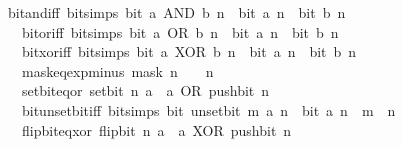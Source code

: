 \begin{isabellebody}
\ \ \ bit{\isacharunderscore}{\kern0pt}and{\isacharunderscore}{\kern0pt}iff\ {\isacharbrackleft}{\kern0pt}bit{\isacharunderscore}{\kern0pt}simps{\isacharbrackright}{\kern0pt}{\isacharcolon}{\kern0pt}\ {\isacartoucheopen}bit\ {\isacharparenleft}{\kern0pt}a\ AND\ b{\isacharparenright}{\kern0pt}\ n\ {\isasymlongleftrightarrow}\ bit\ a\ n\ {\isasymand}\ bit\ b\ n{\isacartoucheclose}\isanewline
\ \ \ \ \ bit{\isacharunderscore}{\kern0pt}or{\isacharunderscore}{\kern0pt}iff\ {\isacharbrackleft}{\kern0pt}bit{\isacharunderscore}{\kern0pt}simps{\isacharbrackright}{\kern0pt}{\isacharcolon}{\kern0pt}\ {\isacartoucheopen}bit\ {\isacharparenleft}{\kern0pt}a\ OR\ b{\isacharparenright}{\kern0pt}\ n\ {\isasymlongleftrightarrow}\ bit\ a\ n\ {\isasymor}\ bit\ b\ n{\isacartoucheclose}\isanewline
\ \ \ \ \ bit{\isacharunderscore}{\kern0pt}xor{\isacharunderscore}{\kern0pt}iff\ {\isacharbrackleft}{\kern0pt}bit{\isacharunderscore}{\kern0pt}simps{\isacharbrackright}{\kern0pt}{\isacharcolon}{\kern0pt}\ {\isacartoucheopen}bit\ {\isacharparenleft}{\kern0pt}a\ XOR\ b{\isacharparenright}{\kern0pt}\ n\ {\isasymlongleftrightarrow}\ bit\ a\ n\ {\isasymnoteq}\ bit\ b\ n{\isacartoucheclose}\isanewline
\ \ \ \ \ mask{\isacharunderscore}{\kern0pt}eq{\isacharunderscore}{\kern0pt}exp{\isacharunderscore}{\kern0pt}minus{\isacharunderscore}{\kern0pt}{}{\isacharcolon}{\kern0pt}\ {\isacartoucheopen}mask\ n\ {\isacharequal}{\kern0pt}\ {}\ {\isacharcircum}{\kern0pt}\ n\ {\isacharminus}{\kern0pt}\ {}{\isacartoucheclose}\isanewline
\ \ \ \ \ set{\isacharunderscore}{\kern0pt}bit{\isacharunderscore}{\kern0pt}eq{\isacharunderscore}{\kern0pt}or{\isacharcolon}{\kern0pt}\ {\isacartoucheopen}set{\isacharunderscore}{\kern0pt}bit\ n\ a\ {\isacharequal}{\kern0pt}\ a\ OR\ push{\isacharunderscore}{\kern0pt}bit\ n\ {}{\isacartoucheclose}\isanewline
\ \ \ \ \ bit{\isacharunderscore}{\kern0pt}unset{\isacharunderscore}{\kern0pt}bit{\isacharunderscore}{\kern0pt}iff\ {\isacharbrackleft}{\kern0pt}bit{\isacharunderscore}{\kern0pt}simps{\isacharbrackright}{\kern0pt}{\isacharcolon}{\kern0pt}\ {\isacartoucheopen}bit\ {\isacharparenleft}{\kern0pt}unset{\isacharunderscore}{\kern0pt}bit\ m\ a{\isacharparenright}{\kern0pt}\ n\ {\isasymlongleftrightarrow}\ bit\ a\ n\ {\isasymand}\ m\ {\isasymnoteq}\ n{\isacartoucheclose}\isanewline
\ \ \ \ \ flip{\isacharunderscore}{\kern0pt}bit{\isacharunderscore}{\kern0pt}eq{\isacharunderscore}{\kern0pt}xor{\isacharcolon}{\kern0pt}\ {\isacartoucheopen}flip{\isacharunderscore}{\kern0pt}bit\ n\ a\ {\isacharequal}{\kern0pt}\ a\ XOR\ push{\isacharunderscore}{\kern0pt}bit\ n\ {}{\isacartoucheclose}\isanewline

\end{isabellebody}
